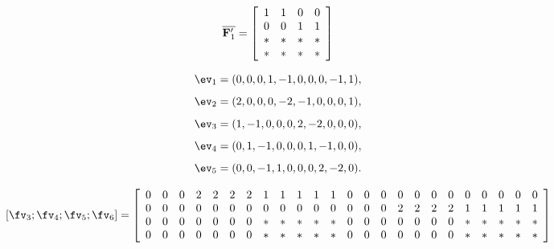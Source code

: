 \documentclass[conference,letterpaper]{IEEEtran}
\begin{document}
\begin{equation} \label{eq:scheme 3 sub sub transmission}
\overline{{\bf F}^{\prime}_1}= \left[
\begin{array}{cccc}
  1 & 1 & 0 & 0  \\
  0 & 0 & 1 & 1 \\
  * & * & * & *  \\
  * & * & * & *
\end{array}
 \right]
\end{equation}

\[
\ev_1 = (0, 0, 0, 1, -1, 0, 0, 0, -1, 1),
\]
\[
\ev_2 = (2, 0, 0, 0, -2, -1, 0, 0, 0, 1),
\]
\[
\ev_3 = (1, -1, 0, 0, 0, 2, -2, 0, 0, 0),
\]
\[
\ev_4 = (0, 1, -1, 0, 0, 0, 1, -1, 0, 0),
\]
\[
\ev_5 = (0, 0, -1, 1, 0, 0, 0, 2, -2, 0).
\]
\begin{figure*}
\begin{equation} \label{eq:scheme 3 transmission of second class}
\begin{aligned}
\left[ {\fv}_3 ;  {\fv}_4 ;  {\fv}_5 ;  {\fv}_6 \right] = 
 \left[
\begin{array}{cccccccccccccccccccccccc}
 0 & 0 & 0 &  2 & 2 & 2 & 2 &  1 & 1 & 1 & 1 & 1 & 0 & 0 & 0 & 0 & 0 & 0 & 0 & 0 & 0 & 0 & 0 & 0 \\
 0 & 0 & 0 & 0 & 0 & 0 & 0 & 0 & 0 & 0 & 0 & 0 & 0 & 0 & 0 & 2 & 2 & 2 & 2 & 1 & 1 & 1 & 1 & 1 \\
 0 & 0 & 0 & 0 & 0 & 0 & 0 & * & * & * & * & * & 0 & 0 & 0 & 0 & 0 & 0 & 0 & * & * & * & * & * \\
 0 & 0 & 0 & 0 & 0 & 0 & 0 & * & * & * & * & * & 0 & 0 & 0 & 0 & 0 & 0 & 0 & * & * & * & * & *
\end{array}
 \right]
\end{aligned}
\end{equation}
\end{figure*}
\end{document}
